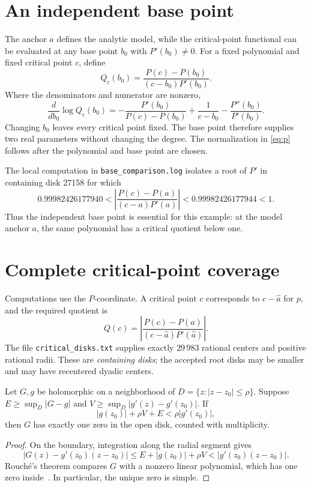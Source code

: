 \documentclass[11pt,a4paper]{article}
\newcommand{\abs}[1]{\left|#1\right|}
\newcommand{\file}[1]{\textnormal{\small\ttfamily\nolinkurl{#1}}}
\newcommand{\astar}{\widehat a}
\begin{document}
\section{An independent base point}\label{sec:search}
The anchor $a$ defines the analytic model, while the critical-point functional
can be evaluated at any base point $b_0$ with $P'(b_0)\ne0$. For a fixed
polynomial and fixed critical point $c$, define
\[
 Q_c(b_0)=\frac{P(c)-P(b_0)}{(c-b_0)P'(b_0)}.
\]
Where the denominators and numerator are nonzero,
\begin{equation}\label{eq:base-gradient}
 \frac{d}{db_0}\log Q_c(b_0)
 =-\frac{P'(b_0)}{P(c)-P(b_0)}+\frac1{c-b_0}
  -\frac{P''(b_0)}{P'(b_0)}.
\end{equation}
Changing $b_0$ leaves every critical point fixed. The base point therefore
supplies two real parameters without changing the degree. The normalization
in \eqref{eq:p} follows after the polynomial and base point are chosen.





The local computation in \file{base_comparison.log} isolates a root of $P'$
in containing disk 27158 for which
\[
 0.99982426177940
 <\abs{\frac{P(c)-P(a)}{(c-a)P'(a)}}
 <0.99982426177944<1.
\]
Thus the independent base point is essential for this example: at the model
anchor $a$, the same polynomial has a critical quotient below one.
\section{Complete critical-point coverage}\label{sec:count}
Computations use the $P$-coordinate. A critical point $c$ corresponds to
$c-\astar$ for $p$, and the required quotient is
\begin{equation}\label{eq:quotient}
 Q(c)=\abs{\frac{P(c)-P(\astar)}{(c-\astar)P'(\astar)}}.
\end{equation}
The file \file{critical_disks.txt} supplies exactly $29\,983$ rational centers
and positive rational radii. These are \emph{containing disks}; the accepted
root disks may be smaller and may have recentered dyadic centers.

\begin{lemma}\label{lem:model}
Let $G,g$ be holomorphic on a neighborhood of $D=\{z:|z-z_0|\le\rho\}$.
Suppose $E\ge\sup_D|G-g|$ and $V\ge\sup_D|g'(z)-g'(z_0)|$. If
\begin{equation}\label{eq:rouche}
 |g(z_0)|+\rho V+E<\rho|g'(z_0)|,
\end{equation}
then $G$ has exactly one zero in the open disk, counted with multiplicity.
\end{lemma}
\begin{proof}
On the boundary, integration along the radial segment gives
\[
 |G(z)-g'(z_0)(z-z_0)|\le E+|g(z_0)|+\rho V
                  <|g'(z_0)(z-z_0)|.
\]
Rouch\'e's theorem compares $G$ with a nonzero linear polynomial, which has
one zero inside~\cite{DLMFComplex}. In particular, the unique zero is simple.
\end{proof}
\end{document}
